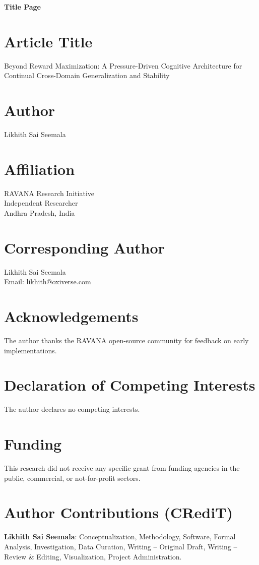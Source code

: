 \documentclass[11pt]{article}
\begin{document}
\begin{center}
{\LARGE\bfseries Title Page}\\[2ex]
\end{center}

\vspace{1cm}

\section*{Article Title}
Beyond Reward Maximization: A Pressure-Driven Cognitive Architecture for Continual Cross-Domain Generalization and Stability

\section*{Author}
Likhith Sai Seemala

\section*{Affiliation}
RAVANA Research Initiative\\
Independent Researcher\\
Andhra Pradesh, India

\section*{Corresponding Author}
Likhith Sai Seemala\\
Email: likhith@oxiverse.com

\section*{Acknowledgements}
The author thanks the RAVANA open-source community for feedback on early implementations.

\section*{Declaration of Competing Interests}
The author declares no competing interests.

\section*{Funding}
This research did not receive any specific grant from funding agencies in the public, commercial, or not-for-profit sectors.

\section*{Author Contributions (CRediT)}
\textbf{Likhith Sai Seemala}: Conceptualization, Methodology, Software, Formal Analysis, Investigation, Data Curation, Writing -- Original Draft, Writing -- Review \& Editing, Visualization, Project Administration.
\end{document}
